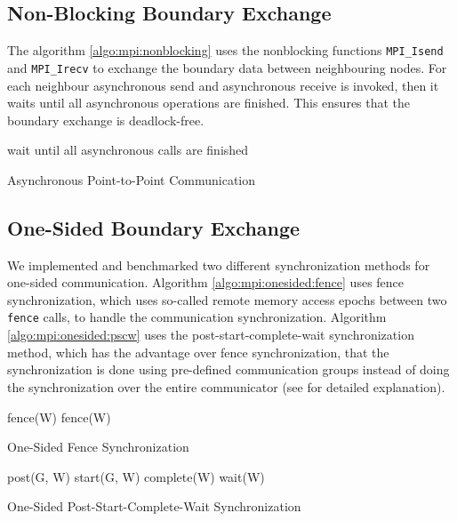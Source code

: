 \documentclass[11pt,a4paper]{article}
\begin{document}
\subsection{Non-Blocking Boundary Exchange}
The algorithm \ref{algo:mpi:nonblocking} uses the nonblocking functions \verb|MPI_Isend| and \verb|MPI_Irecv| to exchange the boundary data between neighbouring nodes. For each neighbour asynchronous send and asynchronous receive is invoked, then it waits until all asynchronous operations are finished. This ensures that the boundary exchange is deadlock-free.\\

\begin{algorithm}[H] \label{algo:mpi:nonblocking}
 wait until all asynchronous calls are finished\;
 \caption{Asynchronous Point-to-Point Communication}
\end{algorithm}

\subsection{One-Sided Boundary Exchange}
We implemented and benchmarked two different synchronization methods for one-sided communication. Algorithm \ref{algo:mpi:onesided:fence} uses fence synchronization, which uses so-called remote memory access epochs between two \verb|fence| calls, to handle the communication synchronization. Algorithm \ref{algo:mpi:onesided:pscw} uses the post-start-complete-wait synchronization method, which has the advantage over fence synchronization, that the synchronization is done using pre-defined communication groups instead of doing the synchronization over the entire communicator (see \cite{SteveLantz2013} for detailed explanation).\\

\begin{algorithm}[H] \label{algo:mpi:onesided:fence}
 fence(W)\;
 fence(W)\;
 \caption{One-Sided Fence Synchronization}
\end{algorithm}

\begin{algorithm}[H] \label{algo:mpi:onesided:pscw}
 post(G, W)\;
 start(G, W)\;
 complete(W)\;
 wait(W)\;
 \caption{One-Sided Post-Start-Complete-Wait Synchronization}
\end{algorithm}
\end{document}
